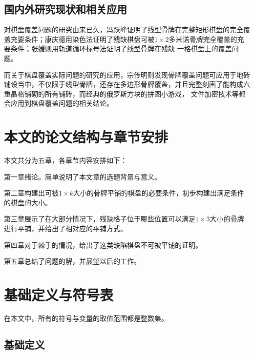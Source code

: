 \subsection{国内外研究现状和相关应用}
\label{sec:related_work}
对棋盘覆盖问题的研究由来已久，冯跃峰证明了线型骨牌在完整矩形棋盘的完全覆盖充要条件；康庆德用染色法证明了残缺棋盘可被$1 \times 2$多米诺骨牌完全覆盖的充要条件；张媛则用轨道循环标号法证明了线型骨牌在残缺
一格棋盘上的覆盖问题。

而关于棋盘覆盖实际问题的研究的应用，宗传明则发现骨牌覆盖问题可应用于地砖铺设当中，不仅限于线型骨牌，还存在多边形骨牌覆盖，并且完整刻画了能构成六重晶格铺砌的所有铺砖，而经典的俄罗斯方块的拼图小游戏，
文件加密技术等都会应用到棋盘覆盖问题的相关结论。
\section{本文的论文结构与章节安排}

\label{sec:arrangement}

本文共分为五章，各章节内容安排如下：

第一章绪论。简单说明了本文章的选题背景与意义。

第二章构建出可被$1 \times k$大小的骨牌平铺的棋盘的必要条件，初步构建出满足条件的棋盘的大小。

第三章展示了在大部分情况下，残缺格子位于哪些位置可以满足$1 \times 3$大小的骨牌进行平铺，并给出了相对应的平铺方式。

第四章对于棘手的情况，给出了这类缺陷棋盘不可被平铺的证明。

第五章总结了问题的解，并展望以后的工作。

\section{基础定义与符号表}

在本文中，所有的符号与变量的取值范围都是整数集。

\subsection{基础定义}


